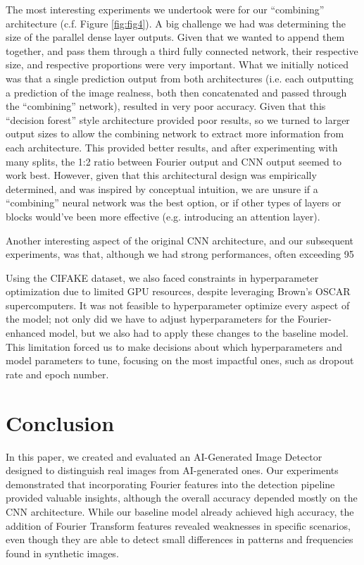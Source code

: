 The most interesting experiments we undertook were for our “combining” architecture (c.f. Figure \ref{fig:fig4}). A big challenge we had was determining the size of the parallel dense layer outputs. Given that we wanted to append them together, and pass them through a third fully connected network, their respective size, and respective proportions were very important. What we initially noticed was that a single prediction output from both architectures (i.e. each outputting a prediction of the image realness, both then concatenated and passed through the “combining” network), resulted in very poor accuracy. Given that this “decision forest” style architecture provided poor results, so we turned to larger output sizes to allow the combining network to extract more information from each architecture. This provided better results, and after experimenting with many splits, the 1:2 ratio between Fourier output and CNN output seemed to work best. However, given that this architectural design was empirically determined, and was inspired by conceptual intuition, we are unsure if a “combining” neural network was the best option, or if other types of layers or blocks would’ve been more effective (e.g. introducing an attention layer).

Another interesting aspect of the original CNN architecture, and our subsequent experiments, was that, although we had strong performances, often exceeding 95%

Using the CIFAKE dataset, we also faced constraints in hyperparameter optimization due to limited GPU resources, despite leveraging Brown’s OSCAR supercomputers. It was not feasible to hyperparameter optimize every aspect of the model; not only did we have to adjust hyperparameters for the Fourier-enhanced model, but we also had to apply these changes to the baseline model. This limitation forced us to make decisions about which hyperparameters and model parameters to tune, focusing on the most impactful ones, such as dropout rate and epoch number.


\section{Conclusion}

In this paper, we created and evaluated an AI-Generated Image Detector designed to distinguish real images from AI-generated ones. Our experiments demonstrated that incorporating Fourier features into the detection pipeline provided valuable insights, although the overall accuracy depended mostly on the CNN architecture. While our baseline model already achieved high accuracy, the addition of Fourier Transform features revealed weaknesses in specific scenarios, even though they are able to detect small differences in patterns and frequencies found in synthetic images.

